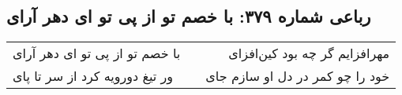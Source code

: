 \begin{center}
\section*{رباعی شماره ۳۷۹: با خصم تو از پی تو ای دهر آرای}
\label{sec:sh379}
\begin{longtable}{l p{0.5cm} r}
با خصم تو از پی تو ای دهر آرای
&&
مهرافزایم گر چه بود کین‌افزای
\\
ور تیغ دورویه کرد از سر تا پای
&&
خود را چو کمر در دل او سازم جای
\\
\end{longtable}
\end{center}
